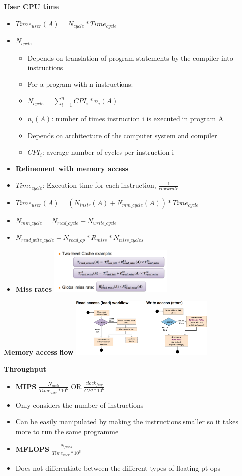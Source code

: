 \documentclass[10pt, landscape]{article}
\begin{document}
\begin{multicols}{4}
\textbf{User CPU time}
\begin{itemize}
    \item \textbf{$Time_{user}(A)=N_{cycle} * Time_{cycle}$}
    \item $N_{cycle}$
    \begin{itemize}
        \item Depends on translation of program statements by the compiler into instructions
        \item For a program with n instructions:
        \item $N_{cycle} = \sum_{i=1}^{n} CPI_i * n_i(A)$
        \item $n_i(A)$: number of times instruction i is executed in program A
        \item Depends on architecture of the computer system  and compiler
        \item $CPI_i$: average number of cycles per instruction i
    \end{itemize}  
    \item \textbf{Refinement with memory access}
    \item $Time_{cycle}$: Execution time for each instruction, $\frac{1}{clock rate}$
    \item  $Time_{user}(A)=(N_{instr}(A) + N_{mm\_cycle}(A)) * Time_{cycle}$
    \item $N_{mm\_cycle}=N_{read\_cycle} + N_{write\_cycle}$
    \item $N_{read\_wite\_cycle}=N_{read\_ op}*R_{miss}*N_{miss\_cycles}$
    \item \textbf{Miss rates}
    \includegraphics*[width=6cm]{miss_rate}
\end{itemize}


\textbf{Memory access flow}
\includegraphics*[width=7cm]{read_write}

\textbf{Throughput}
\begin{itemize}
    \item \textbf{MIPS} $\frac{N_{instr}}{Time_{user}*10^6}$ OR $\frac{clock_{freq}}{CPI*10^6}$
    \item Only considers the number of instructions 
    \item Can be easily manipulated by making the instructions smaller so it takes more to run the same programme 
    \item \textbf{MFLOPS} $\frac{N_{flops}}{Time_{user}*10^6}$
    \item Does not differentiate between the different types of floating pt ops 
\end{itemize}


\end{multicols}
\end{document}
